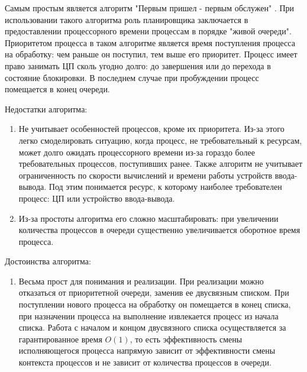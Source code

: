 Самым простым является алгоритм "Первым пришел - первым обслужен" \cite{ubuntuman} \cite{tanenbaum}. При использовании такого алгоритма роль планировщика заключается в предоставлении процессорного времени процессам в порядке "живой очереди". Приоритетом процесса в таком алгоритме является время поступления процесса на обработку: чем раньше он поступил, тем выше его приоритет. Процесс имеет право занимать ЦП сколь угодно долго: до завершения или до перехода в состояние блокировки. В последнем случае при пробуждении процесс помещается в конец очереди. 

Недостатки алгоритма:
\begin{enumerate}[label=---]

\item Не учитывает особенностей процессов, кроме их приоритета. Из-за этого легко смоделировать ситуацию, когда процесс, не требовательный к ресурсам, может долго ожидать процессорного времени из-за гораздо более требовательных процессов, поступивших ранее. Также алгоритм не учитывает ограниченность по скорости вычислений и времени работы устройств ввода-вывода. Под этим понимается ресурс, к которому наиболее требователен процесс: ЦП или устройство ввода-вывода.

\item Из-за простоты алгоритма его сложно масштабировать: при увеличении количества процессов в очереди существенно увеличивается оборотное время процесса.
\end{enumerate} 

Достоинства алгоритма:
\begin{enumerate}[label=---]
\item Весьма прост для понимания и реализации. При реализации можно отказаться от приоритетной очереди, заменив ее двусвязным списком. При поступлении нового процесса на обработку он помещается в конец списка, при назначении процесса на выполнение извлекается процесс из начала списка. Работа с началом и концом двусвязного списка осуществляется за гарантированное время $O(1)$, то есть эффективность смены исполняющегося процесса напрямую зависит от эффективности смены контекста процессов и не зависит от количества процессов в очереди.
\end{enumerate}